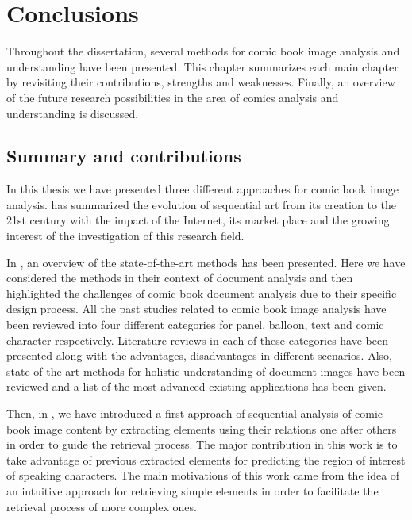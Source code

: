 \chapter{Conclusions} %
\label{chap:conclusions}

Throughout the dissertation, several methods for comic book image analysis and understanding have been presented.
This chapter summarizes each main chapter by revisiting their contributions, strengths and weaknesses.
Finally, an overview of the future research possibilities in the area of comics analysis and understanding is discussed.

\section{Summary and contributions}
\label{conclusions:summary}


In this thesis we have presented three different approaches for comic book image analysis.  has summarized the evolution of sequential art from its creation to the 21st century with the impact of the Internet, its market place and the growing interest of the investigation of this research field.

In , an overview of the state-of-the-art methods has been presented. Here we have considered the methods in their context of document analysis and then highlighted the challenges of comic book document analysis due to their specific design process.
All the past studies related to comic book image analysis have been reviewed into four different categories for panel, balloon, text and comic character respectively.
Literature reviews in each of these categories have been presented along with the advantages, disadvantages in different scenarios.
Also, state-of-the-art methods for holistic understanding of document images have been reviewed and a list of the most advanced existing applications has been given.

Then, in , we have introduced a first approach of sequential analysis of comic book image content by extracting elements using their relations one after others in order to guide the retrieval process.
The major contribution in this work is to take advantage of previous extracted elements for predicting the region of interest of speaking characters.
The main motivations of this work came from the idea of an intuitive approach for retrieving simple elements in order to facilitate the retrieval process of more complex ones.

